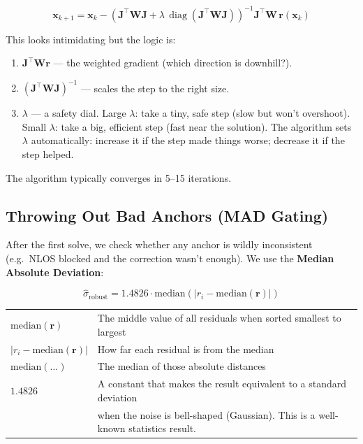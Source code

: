 \documentclass[11pt,a4paper]{article}
\newcommand{\vect}[1]{\bm{#1}}
\newcommand{\mat}[1]{\mathbf{#1}}
\DeclareMathOperator{\diag}{diag}
\begin{document}
\begin{equation}
\vect{x}_{k+1} = \vect{x}_k - \left(\mat{J}^\top \mat{W} \mat{J} + \lambda\,\diag(\mat{J}^\top \mat{W} \mat{J})\right)^{-1} \mat{J}^\top \mat{W}\, \vect{r}(\vect{x}_k)
\label{eq:lm}
\end{equation}

This looks intimidating but the logic is:
\begin{enumerate}[leftmargin=2em]
  \item $\mat{J}^\top\mat{W}\vect{r}$ --- the weighted gradient (which direction is downhill?).
  \item $(\mat{J}^\top\mat{W}\mat{J})^{-1}$ --- scales the step to the right size.
  \item $\lambda$ --- a safety dial. Large $\lambda$: take a tiny, safe step (slow but won't overshoot). Small $\lambda$: take a big, efficient step (fast near the solution). The algorithm sets $\lambda$ automatically: increase it if the step made things worse; decrease it if the step helped.
\end{enumerate}
The algorithm typically converges in 5--15 iterations.

\subsection{Throwing Out Bad Anchors (MAD Gating)}

After the first solve, we check whether any anchor is wildly inconsistent (e.g.\ NLOS blocked and the correction wasn't enough). We use the \textbf{Median Absolute Deviation}:

\begin{equation}
\hat{\sigma}_{\text{robust}} = 1.4826 \cdot \text{median}\!\left(|r_i - \text{median}(\vect{r})|\right)
\end{equation}

\begin{symbols}
\begin{tabular}{ll}
$\text{median}(\vect{r})$ & The middle value of all residuals when sorted smallest to largest \\
$|r_i - \text{median}(\vect{r})|$ & How far each residual is from the median \\
$\text{median}(\ldots)$ & The median of those absolute distances \\
$1.4826$ & A constant that makes the result equivalent to a standard deviation \\
   & when the noise is bell-shaped (Gaussian). This is a well-known statistics result. \\
\end{tabular}
\end{symbols}
\end{document}
